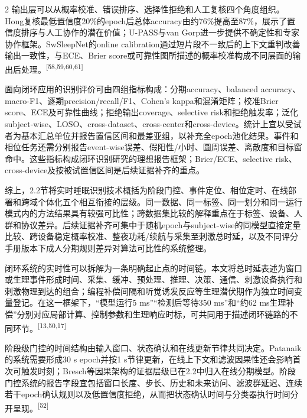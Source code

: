 \documentclass[UTF8,zihao=5,fontset=none]{ctexart}
\newcommand{\hei}{\CJKfamily{hei}}
\newcommand{\leveltwo}[1]{%
  \par\vspace{6pt}\noindent{\hei\fontsize{10pt}{16pt}\selectfont\bfseries #1\par}\vspace{2pt}}
\newcommand{\refcite}[1]{\nolinebreak[4]\textsuperscript{[#1]}}
\begin{document}
\begin{multicols}{2}
输出层可以从概率校准、错误排序、选择性拒绝和人工复核四个角度组织。Hong复核最低置信度20\%的epoch后总体accuracy由约76\%提高至87\%，展示了置信度排序与人工协作的潜在价值；U-PASS与van Gorp进一步提供不确定性和专家协作框架。SwSleepNet的online calibration通过短片段不一致后的上下文重判改善输出一致性，与ECE、Brier score或可靠性图所描述的概率校准构成不同层面的输出后处理。\refcite{58,59,60,61}\par

面向闭环应用的识别评价可由四组指标构成：分期accuracy、balanced accuracy、macro-F1、逐期precision/recall/F1、Cohen's kappa和混淆矩阵；校准Brier score、ECE及可靠性曲线；拒绝输出coverage、selective risk和拒绝触发率；泛化subject-wise、LOSO、cross-dataset、cross-center和cross-device。统计上宜以受试者为基本汇总单位并报告置信区间和最差亚组，以补充全epoch池化结果。事件和相位任务还需分别报告event-wise误差、假阳性/小时、圆周误差、离散度和目标窗命中。这些指标构成闭环识别研究的理想报告框架；Brier/ECE、selective risk、cross-device及按被试置信区间是后续证据补齐的重点。\par

综上，2.2节将实时睡眠识别技术概括为阶段门控、事件定位、相位定时、在线部署和跨域个体化五个相互衔接的层级。同一数据、同一标签、同一划分和同一运行模式内的方法结果具有较强可比性；跨数据集比较的解释重点在于标签、设备、人群和协议差异。后续证据补齐可集中于随机epoch与subject-wise的同模型直接定量比较、跨设备稳定概率校准、整夜功耗/续航与采集至刺激总时延，以及不同评分手册版本下成人分期规则差异对算法可比性的系统整理。\par

\leveltwo{2.3 闭环系统的延迟与精度}

闭环系统的实时性可以拆解为一条明确起止点的时间链。本文将总时延表述为窗口或生理事件形成时间、采集、缓冲、预处理、推理、决策、通信、刺激设备执行和刺激物理到达的组合；编程补偿间隔和听觉诱发反应等生理潜伏期作为独立时间变量登记。在这一框架下，“模型运行5 ms”“检测后等待350 ms”和“约62 ms生理补偿”分别对应局部计算、控制参数和生理响应时标，可共同用于描述闭环链路的不同环节。\refcite{13,50,17}\par

阶段级门控的时间结构由输入窗口、状态确认和在线更新节律共同决定。Patanaik的系统需要形成30 s epoch并按1 s节律更新，在线上下文和滤波因果性还会影响首次可触发时刻；Bresch等因果架构的证据层级已在2.2中归入在线分期模型。阶段门控系统的报告字段宜包括窗口长度、步长、历史和未来访问、滤波群延迟、连续若干epoch确认规则以及低置信度拒绝，从而把状态确认时间与分类器执行时间分开呈现。\refcite{52}\par


\end{multicols}
\end{document}
